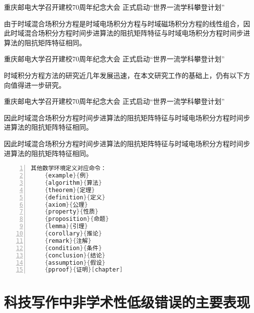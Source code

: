 \documentclass{cqupt_thesis}
\begin{document}
    重庆邮电大学召开建校70周年纪念大会 正式启动“世界一流学科攀登计划”

    \begin{pproof}
        由于时域混合场积分方程是时域电场积分方程与时域磁场积分方程的线性组合，因此时域混合场积分方程时间步进算法的阻抗矩阵特征与时域电场积分方程时间步进算法的阻抗矩阵特征相同。
    \end{pproof}

    重庆邮电大学召开建校70周年纪念大会 正式启动“世界一流学科攀登计划”

    \begin{corollary}
        时域积分方程方法的研究近几年发展迅速，在本文研究工作的基础上，仍有以下方向值得进一步研究。
    \end{corollary}

    重庆邮电大学召开建校70周年纪念大会 正式启动“世界一流学科攀登计划”

    \begin{lemma}[芜湖]
        因此时域混合场积分方程时间步进算法的阻抗矩阵特征与时域电场积分方程时间步进算法的阻抗矩阵特征相同。
    \end{lemma}

    \begin{lemma}
        因此时域混合场积分方程时间步进算法的阻抗矩阵特征与时域电场积分方程时间步进算法的阻抗矩阵特征相同。
    \end{lemma}

    \begin{lstlisting}[language = c, numbers=left,
    numberstyle=\tiny,keywordstyle=\color{blue!70},
    commentstyle=\color{red!50!green!50!blue!50},frame=shadowbox,
    rulesepcolor=\color{red!20!green!20!blue!20},basicstyle=\ttfamily]
	其他数学环境定义对应命令：
	{example}{例}           
	{algorithm}{算法}
	{theorem}{定理}
	{definition}{定义}
	{axiom}{公理}
	{property}{性质}
	{proposition}{命题}
	{lemma}{引理}
	{corollary}{推论}
	{remark}{注解}
	{condition}{条件}
	{conclusion}{结论}
	{assumption}{假设}
	{pproof}{证明}[chapter]

    \end{lstlisting}



    \begin{reference}
        
    \end{reference}

    \appendix


    \chapter{科技写作中非学术性低级错误的主要表现}
\end{document}
